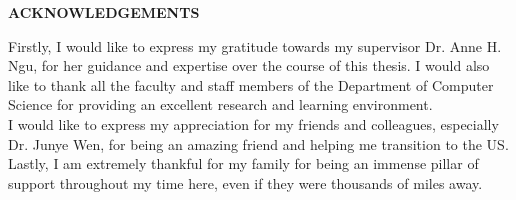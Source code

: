 \begin{center}
\textbf{ACKNOWLEDGEMENTS}
\end{center}


Firstly, I would like to express my gratitude towards my supervisor Dr. Anne H. Ngu, for her guidance and 
expertise over the course of this thesis. I would also like to thank all the faculty and staff members of 
the Department of Computer Science for providing an excellent research and learning environment. \\
I would like to express my appreciation for my friends and colleagues, especially Dr. Junye Wen, for 
being an amazing friend and helping me transition to the US. Lastly, I am extremely thankful for my family 
for being an immense pillar of support throughout my time here, even if they were thousands of miles away.